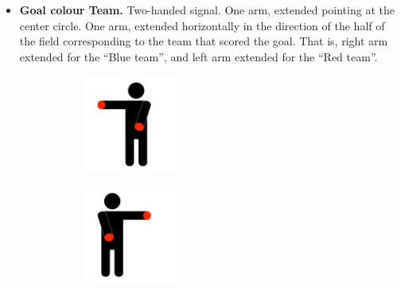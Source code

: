 \begin{itemize}
            \item \textbf{Goal \textlangle{}colour\textrangle{}  Team.}
            Two-handed signal. One arm, extended pointing at the center circle. One arm, extended horizontally in the direction of the half of the field corresponding to the team that scored the goal. That is, right arm extended for the ``Blue team'', and left arm extended for the ``Red team''.
            \begin{figure}[ht!]
                \centering
                \begin{subfigure}{.33\textwidth}
                  \includegraphics[height=120px]{figs/referee-signals/goal.png}
                \end{subfigure}
                \begin{subfigure}{.33\textwidth}
                  \includegraphics[height=120px]{figs/referee-signals/goal-flipped.png}
                \end{subfigure}
            \end{figure}



\end{itemize}
